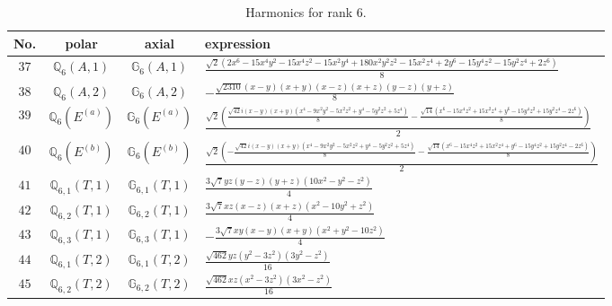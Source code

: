 \documentclass[fleqn,8pt,landscape]{jsarticle}
\begin{document}
\begin{table}[ht!]
\begin{center}
\caption{Harmonics for rank 6.}
\renewcommand{\arraystretch}{1.3}
\begin{tabular}{cccl} \hline \hline
No. & polar & axial & expression \\ \hline
$ 37 $ & $ \mathbb{Q}_{6}(A,1) $ & $ \mathbb{G}_{6}(A,1) $ & $ \frac{\sqrt{2} \left(2 x^{6} - 15 x^{4} y^{2} - 15 x^{4} z^{2} - 15 x^{2} y^{4} + 180 x^{2} y^{2} z^{2} - 15 x^{2} z^{4} + 2 y^{6} - 15 y^{4} z^{2} - 15 y^{2} z^{4} + 2 z^{6}\right)}{8} $ \\
$ 38 $ & $ \mathbb{Q}_{6}(A,2) $ & $ \mathbb{G}_{6}(A,2) $ & $ - \frac{\sqrt{2310} \left(x - y\right) \left(x + y\right) \left(x - z\right) \left(x + z\right) \left(y - z\right) \left(y + z\right)}{8} $ \\
$ 39 $ & $ \mathbb{Q}_{6}(E^{(a)}) $ & $ \mathbb{G}_{6}(E^{(a)}) $ & $ \frac{\sqrt{2} \left(\frac{\sqrt{42} i \left(x - y\right) \left(x + y\right) \left(x^{4} - 9 x^{2} y^{2} - 5 x^{2} z^{2} + y^{4} - 5 y^{2} z^{2} + 5 z^{4}\right)}{8} - \frac{\sqrt{14} \left(x^{6} - 15 x^{4} z^{2} + 15 x^{2} z^{4} + y^{6} - 15 y^{4} z^{2} + 15 y^{2} z^{4} - 2 z^{6}\right)}{8}\right)}{2} $ \\
$ 40 $ & $ \mathbb{Q}_{6}(E^{(b)}) $ & $ \mathbb{G}_{6}(E^{(b)}) $ & $ \frac{\sqrt{2} \left(- \frac{\sqrt{42} i \left(x - y\right) \left(x + y\right) \left(x^{4} - 9 x^{2} y^{2} - 5 x^{2} z^{2} + y^{4} - 5 y^{2} z^{2} + 5 z^{4}\right)}{8} - \frac{\sqrt{14} \left(x^{6} - 15 x^{4} z^{2} + 15 x^{2} z^{4} + y^{6} - 15 y^{4} z^{2} + 15 y^{2} z^{4} - 2 z^{6}\right)}{8}\right)}{2} $ \\
$ 41 $ & $ \mathbb{Q}_{6,1}(T,1) $ & $ \mathbb{G}_{6,1}(T,1) $ & $ \frac{3 \sqrt{7} y z \left(y - z\right) \left(y + z\right) \left(10 x^{2} - y^{2} - z^{2}\right)}{4} $ \\
$ 42 $ & $ \mathbb{Q}_{6,2}(T,1) $ & $ \mathbb{G}_{6,2}(T,1) $ & $ \frac{3 \sqrt{7} x z \left(x - z\right) \left(x + z\right) \left(x^{2} - 10 y^{2} + z^{2}\right)}{4} $ \\
$ 43 $ & $ \mathbb{Q}_{6,3}(T,1) $ & $ \mathbb{G}_{6,3}(T,1) $ & $ - \frac{3 \sqrt{7} x y \left(x - y\right) \left(x + y\right) \left(x^{2} + y^{2} - 10 z^{2}\right)}{4} $ \\
$ 44 $ & $ \mathbb{Q}_{6,1}(T,2) $ & $ \mathbb{G}_{6,1}(T,2) $ & $ \frac{\sqrt{462} y z \left(y^{2} - 3 z^{2}\right) \left(3 y^{2} - z^{2}\right)}{16} $ \\
$ 45 $ & $ \mathbb{Q}_{6,2}(T,2) $ & $ \mathbb{G}_{6,2}(T,2) $ & $ \frac{\sqrt{462} x z \left(x^{2} - 3 z^{2}\right) \left(3 x^{2} - z^{2}\right)}{16} $ \\

\end{tabular}
\end{center}
\end{table}
\end{document}
